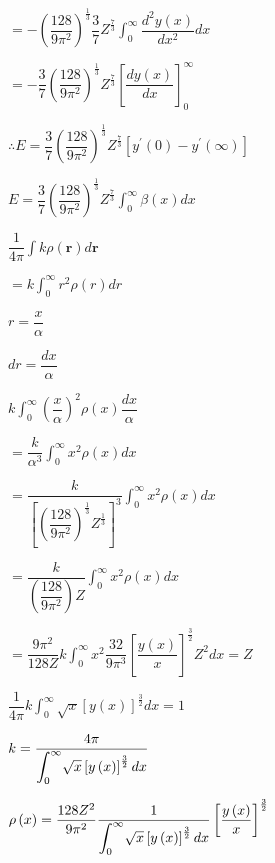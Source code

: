 \documentclass{jarticle}%
\begin{document}
$=-\left(  \dfrac{128}{9\pi^{2}}\right)  ^{\frac{1}{3}}\dfrac{3}{7}Z^{\frac
{7}{3}}%
{\displaystyle\int_{0}^{\infty}}
\dfrac{d^{2}y\left(  x\right)  }{dx^{2}}dx$

$=-\dfrac{3}{7}\left(  \dfrac{128}{9\pi^{2}}\right)  ^{\frac{1}{3}}Z^{\frac
{7}{3}}\left[  \dfrac{dy\left(  x\right)  }{dx}\right]  _{0}^{\infty}$

$\therefore E=\dfrac{3}{7}\left(  \dfrac{128}{9\pi^{2}}\right)  ^{\frac{1}{3}%
}Z^{\frac{7}{3}}\left[  y^{\prime}\left(  0\right)  -y^{\prime}\left(
\infty\right)  \right]  $

$E=\dfrac{3}{7}\left(  \dfrac{128}{9\pi^{2}}\right)  ^{\frac{1}{3}}Z^{\frac
{7}{3}}%
{\displaystyle\int_{0}^{\infty}}
\beta\left(  x\right)  dx$

$\dfrac{1}{4\pi}%
{\displaystyle\int}
k\rho\left(  \mathbf{r}\right)  d\mathbf{r}$

$=k%
{\displaystyle\int_{0}^{\infty}}
r^{2}\rho\left(  r\right)  dr$

$r=\dfrac{x}{\alpha}$

$dr=\dfrac{dx}{\alpha}$

$k%
{\displaystyle\int_{0}^{\infty}}
\left(  \dfrac{x}{\alpha}\right)  ^{2}\rho\left(  x\right)  \dfrac{dx}{\alpha
}$

$=\dfrac{k}{\alpha^{3}}%
{\displaystyle\int_{0}^{\infty}}
x^{2}\rho\left(  x\right)  dx$

$=\dfrac{k}{\left[  \left(  \dfrac{128}{9\pi^{2}}\right)  ^{\frac{1}{3}%
}Z^{\frac{1}{3}}\right]  ^{3}}%
{\displaystyle\int_{0}^{\infty}}
x^{2}\rho\left(  x\right)  dx$

$=\dfrac{k}{\left(  \dfrac{128}{9\pi^{2}}\right)  Z}%
{\displaystyle\int_{0}^{\infty}}
x^{2}\rho\left(  x\right)  dx$

$=\dfrac{9\pi^{2}}{128Z}k%
{\displaystyle\int_{0}^{\infty}}
x^{2}\dfrac{32}{9\pi^{3}}\left[  \dfrac{y\left(  x\right)  }{x}\right]
^{\frac{3}{2}}Z^{2}dx=Z$

$\dfrac{1}{4\pi}k%
{\displaystyle\int_{0}^{\infty}}
\sqrt{x}\left[  y\left(  x\right)  \right]  ^{\frac{3}{2}}dx=1$

$k=\dfrac{4\pi}{%
{\displaystyle\int_{0}^{\infty}}
\sqrt{x}\left[  y\left(  x\right)  \right]  ^{\frac{3}{2}}dx}$

$\rho\left(  x\right)  =\dfrac{128Z^{2}}{9\pi^{2}}\dfrac{1}{%
{\displaystyle\int_{0}^{\infty}}
\sqrt{x}\left[  y\left(  x\right)  \right]  ^{\frac{3}{2}}dx}\left[
\dfrac{y\left(  x\right)  }{x}\right]  ^{\frac{3}{2}}$
\end{document}
